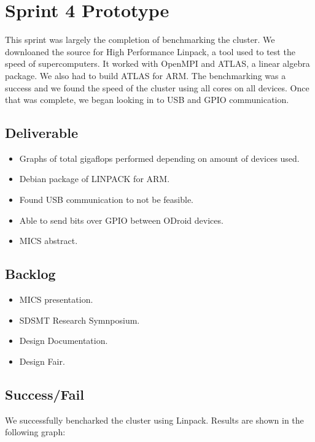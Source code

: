 \section{Sprint 4 Prototype}

This sprint was largely the completion of benchmarking the cluster. We downloaned the source for High Performance Linpack, a tool used to test the speed of supercomputers. It worked with OpenMPI and ATLAS, a linear algebra package. We also had to build ATLAS for ARM. The benchmarking was a success and we found the speed of the cluster using all cores on all devices. Once that was complete, we began looking in to USB and GPIO communication.

\subsection{Deliverable}

\begin{itemize}
\item Graphs of total gigaflops performed depending on amount of devices used.
\item Debian package of LINPACK for ARM.
\item Found USB communication to not be feasible.
\item Able to send bits over GPIO between ODroid devices.
\item MICS abstract.
\end {itemize}

\subsection{Backlog}

\begin{itemize}
\item MICS presentation.
\item SDSMT Research Symnposium.
\item Design Documentation.
\item Design Fair.
\end{itemize}

\subsection{Success/Fail}

We successfully bencharked the cluster using Linpack. Results are shown in the following graph:

